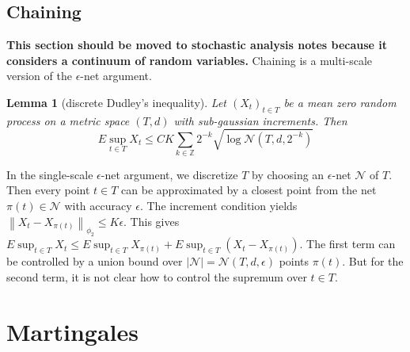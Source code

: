 \documentclass{article}
\newtheorem{Lem}{Lemma}[section]
\theoremstyle{definition}
\begin{document}
\subsection{Chaining}
\textbf{This section should be moved to stochastic analysis notes because it considers a continuum of random variables.}
Chaining is a multi-scale version of the $\epsilon$-net argument.
\begin{Lem}[discrete Dudley's inequality]
    Let $(X_t)_{t\in T}$ be a mean zero random process on a metric space $(T,d)$ with sub-gaussian increments.
    Then \[E\sup_{t\in T}X_t\le CK\sum_{k\in\mathbb{Z}}2^{-k}\sqrt{\log \mathcal{N}(T,d,2^{-k})}\]
\end{Lem}
In the single-scale $\epsilon$-net argument, we discretize $T$ by choosing an $\epsilon$-net $\mathcal{N}$ of $T$.
Then every point $t\in T$ can be approximated by a closest point from the net $\pi(t)\in\mathcal{N}$ with accuracy $\epsilon$.
The increment condition yields $\left\|X_t-X_{\pi(t)}\right\|_{\phi_2}\le K\epsilon$. This gives $E\sup_{t\in T}X_t\le E\sup_{t\in T}X_{\pi(t)}+E\sup_{t\in T}(X_t-X_{\pi(t)})$.
The first term can be controlled by a union bound over $\left|\mathcal{N}\right|=\mathcal{N}(T,d,\epsilon)$ points $\pi(t)$.
But for the second term, it is not clear how to control the supremum over $t\in T$.



\section{Martingales}
\end{document}
